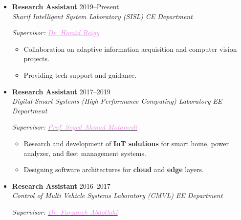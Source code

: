 \documentclass[11pt,a4paper,roman]{moderncv} %
\newcommand*{\authorimg}[1]{%
	\raisebox{-.3\baselineskip}{%
		\texttt{[image: \#1]}%
	}%
}
\begin{document}
\begin{itemize}
	\item \textbf{Research Assistant} \hfill 2019--Present \\
	\authorimg{pictures/sut.png} \emph{Sharif Intelligent System Laboratory (SISL)} \hfill \emph{CE Department}
	
	\begin{adjustwidth}{0.2in}{0in}
		\emph{Supervisor: \href{http://sharif.edu/~beigy}{\textcolor{violet}{Dr. Hamid Beigy}}}
		
		\begin{itemize}
			\item Collaboration on adaptive information acquisition and computer vision projects.
			\item Providing tech support and guidance.
		\end{itemize}
	\end{adjustwidth}
	
	\vspace{3pt}
	
	\item \textbf{Research Assistant} \hfill 2017--2019 \\
	\authorimg{pictures/aut.png} \emph{Digital Smart Systems (High Performance Computing) Laboratory} \hfill \emph{EE Department}
	
	\begin{adjustwidth}{0.2in}{0in}
		\emph{Supervisor: \href{http://ele.aut.ac.ir/~motamedi}{\textcolor{violet}{Prof. Seyed Ahmad Motamedi}}}
		
		\begin{itemize}
			\item Research and development of \textbf{IoT solutions} for smart home, power analyzer, and fleet management systems.
			\item Designing software architectures for \textbf{cloud} and \textbf{edge} layers.
		\end{itemize}
	\end{adjustwidth}

	\vspace{3pt}

	\item \textbf{Research Assistant} \hfill 2016--2017 \\
	\authorimg{pictures/aut.png} \emph{Control of Multi Vehicle Systems Laboratory (CMVL)} \hfill \emph{EE Department}
	
	\begin{adjustwidth}{0.2in}{0in}
		\emph{Supervisor: \href{http://ele.aut.ac.ir/~abdollahi}{\textcolor{violet}{Dr. Farzaneh Abdollahi}}}
		

\end{adjustwidth}
\end{itemize}
\end{document}
